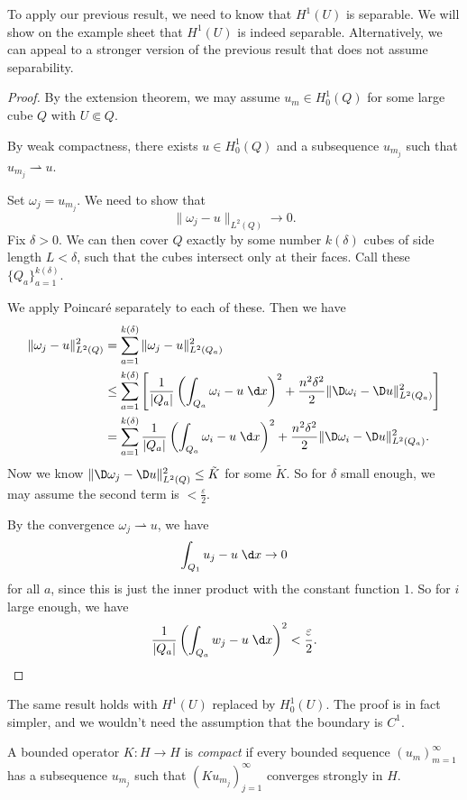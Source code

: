 \documentclass[a4paper]{article}
\begin{document}
To apply our previous result, we need to know that $H^1(U)$ is separable. We will show on the example sheet that $H^1(U)$ is indeed separable. Alternatively, we can appeal to a stronger version of the previous result that does not assume separability.
\begin{proof}
  By the extension theorem, we may assume $u_m \in H^1_0(Q)$ for some large cube $Q$ with $U \Subset Q$.

  By weak compactness, there exists $u \in H_0^1(Q)$ and a subsequence $u_{m_j}$ such that $u_{m_j} \rightharpoonup u$.

  Set $\omega_j = u_{m_j}$. We need to show that
  \[
    \|\omega_j - u\|_{L^2(Q)} \to 0.
  \]
  Fix $\delta > 0$. We can then cover $Q$ exactly by some number $k(\delta)$ cubes of side length $L < \delta$, such that the cubes intersect only at their faces. Call these $\{Q_a\}_{a = 1}^{k(\delta)}$.

  We apply Poincar\'e separately to each of these. Then we have
  \begin{align*}
    \|\omega_j - u\|_{L^2(Q)}^2 &= \sum_{a = 1}^{k(\delta)} \|\omega_j - u\|_{L^2(Q_a)}^2\\
    &\leq \sum_{a = 1}^{k(\delta)} \left[\frac{1}{|Q_a|} \left(\int_{Q_a} \omega_i - u\;\d x\right)^2 + \frac{n^2 \delta^2}{2} \|\D \omega_i - \D u\|^2_{L^2(Q_a)}\right]\\
    &= \sum_{a = 1}^{k(\delta)} \frac{1}{|Q_a|} \left(\int_{Q_a} \omega_i - u\;\d x\right)^2 + \frac{n^2 \delta^2}{2} \|\D \omega_i - \D u\|^2_{L^2(Q_a)}.
  \end{align*}
  Now we know $\|\D \omega_j - \D u\|_{L^2(Q)}^2 \leq \tilde{K}$ for some $\tilde{K}$. So for $\delta$ small enough, we may assume the second term is $< \frac{\varepsilon}{2}$.

  By the convergence $\omega_j \rightharpoonup u$, we have
  \[
    \int_{Q_1} u_j - u\;\d x \to 0
  \]
  for all $a$, since this is just the inner product with the constant function $1$. So for $i$ large enough, we have
  \[
    \frac{1}{|Q_a|} \left(\int_{Q_a} w_j - u \;\d x\right)^2 < \frac{\varepsilon}{2}.
  \]
\end{proof}

The same result holds with $H^1(U)$ replaced by $H^1_0(U)$. The proof is in fact simpler, and we wouldn't need the assumption that the boundary is $C^1$.

\begin{defi}
  A bounded operator $K: H \to H$ is \emph{compact} if every bounded sequence $(u_m)_{m = 1}^\infty$ has a subsequence $u_{m_j}$ such that $(K u_{m_j})_{j = 1}^\infty$ converges strongly in $H$.
\end{defi}
\end{document}
